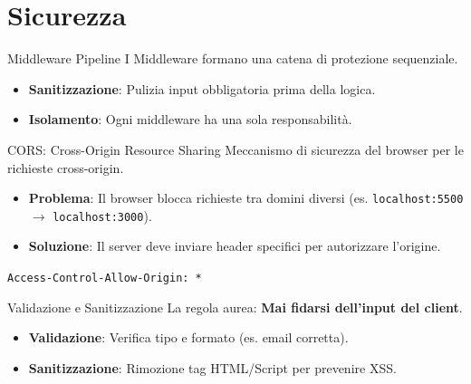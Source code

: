 \documentclass[10pt]{beamer}
\begin{document}
\section{Sicurezza}
\begin{frame}{Middleware Pipeline}
    I Middleware formano una catena di protezione sequenziale.
    \vspace{0.5cm}
    \centering
    \begin{itemize}
        \item \textbf{Sanitizzazione}: Pulizia input obbligatoria prima della logica.
        \item \textbf{Isolamento}: Ogni middleware ha una sola responsabilità.
    \end{itemize}
\end{frame}

\begin{frame}{CORS: Cross-Origin Resource Sharing}
    Meccanismo di sicurezza del browser per le richieste cross-origin.
    \begin{itemize}
        \item \textbf{Problema}: Il browser blocca richieste tra domini diversi (es. \texttt{localhost:5500} $\rightarrow$ \texttt{localhost:3000}).
        \item \textbf{Soluzione}: Il server deve inviare header specifici per autorizzare l'origine.
    \end{itemize}
    \vspace{0.3cm}
    \texttt{Access-Control-Allow-Origin: *}
\end{frame}

\begin{frame}{Validazione e Sanitizzazione}
    La regola aurea: \textbf{Mai fidarsi dell'input del client}.
    \begin{itemize}
        \item \textbf{Validazione}: Verifica tipo e formato (es. email corretta).
        \item \textbf{Sanitizzazione}: Rimozione tag HTML/Script per prevenire XSS.
    \end{itemize}
\end{frame}
\end{document}
